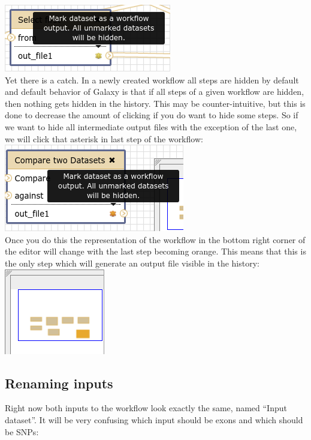 \documentclass[11pt,a4paper]{article}
\begin{document}
\includegraphics[scale=0.55]{figures/101_29}\\
Yet there is a catch. In a newly created workflow all steps are hidden by default and default behavior of Galaxy is that if all steps of a given workflow are hidden, then nothing gets hidden in the history. This may be
counter-intuitive, but this is done to decrease the amount of clicking if you do want to hide some steps. So if we want to hide all intermediate output files with the exception of the last one, we will click that asterisk
in last step of the workflow:\\

\includegraphics[scale=0.55]{figures/101_30}\\
Once you do this the representation of the workflow in the bottom right corner of the editor will change with the last step becoming orange. This means that this is the only step which will generate an output file visible in the history:\\

\includegraphics[scale=0.55]{figures/101_31}\\
\subsection{Renaming inputs}
Right now both inputs to the workflow look exactly the same, named ``Input dataset''. It will be very confusing which input should be exons and which should be SNPs:\\
\end{document}
